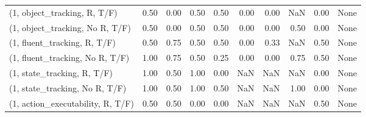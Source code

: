 \begin{table*}[h!]
\begin{adjustbox}{width=2\columnwidth,center}
\begin{tabular}{lrrr|rrr|rrr}
\midrule
(1, object\_tracking, R, T/F)         &                      0.50 &                  0.00 &                      0.50 &                          0.50 &                      0.00 &                          0.00 &                                    NaN &                               0.00 &                                  None \\
(1, object\_tracking, No R, T/F)      &                      0.50 &                  0.00 &                      0.50 &                          0.50 &                      0.00 &                          0.00 &                                   0.50 &                               0.00 &                                  None \\
(1, fluent\_tracking, R, T/F)         &                      0.50 &                  0.75 &                      0.50 &                          0.50 &                      0.00 &                          0.33 &                                    NaN &                               0.50 &                                  None \\
(1, fluent\_tracking, No R, T/F)      &                      1.00 &                  0.75 &                      0.50 &                          0.25 &                      0.00 &                          0.00 &                                   0.75 &                               0.50 &                                  None \\
(1, state\_tracking, R, T/F)          &                      1.00 &                  0.50 &                      1.00 &                          0.00 &                       NaN &                           NaN &                                    NaN &                               0.00 &                                  None \\
(1, state\_tracking, No R, T/F)       &                      1.00 &                  0.50 &                      1.00 &                          0.50 &                       NaN &                           NaN &                                   1.00 &                               0.00 &                                  None \\
(1, action\_executability, R, T/F)    &                      0.50 &                  0.50 &                      0.00 &                          0.00 &                       NaN &                           NaN &                                    NaN &                               0.50 &                                  None \\

\end{tabular}
\end{adjustbox}
\end{table*}
